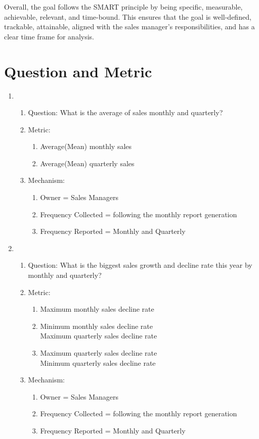 \documentclass[12pt,letterpaper]{report}
\begin{document}
Overall, the goal follows the SMART principle by being specific, measurable, achievable, relevant, and time-bound. This ensures that the goal is well-defined, trackable, attainable, aligned with the sales manager's responsibilities, and has a clear time frame for analysis.



\section{Question and Metric}



\begin{enumerate}
\item
   \begin{enumerate}
	\item Question: What is the average of sales monthly and quarterly?
    \item Metric: 
    \begin{enumerate}
        \item Average(Mean) monthly sales
        \item Average(Mean) quarterly sales
    \end{enumerate}
    \item Mechanism:
    \begin{enumerate}
    \item Owner = Sales Managers
    \item Frequency Collected = following the monthly report generation
    \item Frequency Reported = Monthly and Quarterly
    \end{enumerate}
\end{enumerate}

\item
    \begin{enumerate}
    \item Question: What is the biggest sales growth and decline rate this year by monthly and quarterly?
    \item Metric: 
        \begin{enumerate}
            \item Maximum monthly sales decline rate
            \item Minimum monthly sales decline rate\\Maximum quarterly sales decline rate
            \item Maximum quarterly sales decline rate\\Minimum quarterly sales decline rate
        \end{enumerate}
    \item Mechanism:
	\begin{enumerate}
    \item Owner = Sales Managers
    \item Frequency Collected = following the monthly report generation
    \item Frequency Reported = Monthly and Quarterly
    \end{enumerate}
\end{enumerate}


\end{enumerate}
\end{document}

